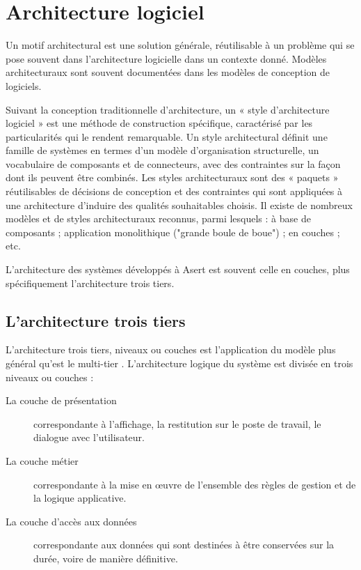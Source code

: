 \section{Architecture logiciel}

Un motif architectural est une solution générale, réutilisable à un problème qui se pose souvent dans l'architecture logicielle dans un contexte donné. Modèles architecturaux sont souvent documentées dans les modèles de conception de logiciels. \cite{software-arch} 

Suivant la conception traditionnelle d'architecture, un « style d'architecture logiciel » est une méthode de construction spécifique, caractérisé par les particularités qui le rendent remarquable. Un style architectural définit une famille de systèmes en termes d'un modèle d'organisation structurelle, un vocabulaire de composants et de connecteurs, avec des contraintes sur la façon dont ils peuvent être combinés. Les styles architecturaux sont des « paquets » réutilisables de décisions de conception et des contraintes qui sont appliquées à une architecture d'induire des qualités souhaitables choisis. Il existe de nombreux modèles et de styles architecturaux reconnus, parmi lesquels : à base de composants ; application monolithique ("grande boule de boue") ; en couches ; etc. \cite{software-arch-patterns}

L'architecture des systèmes développés à Asert est souvent celle en couches, plus spécifiquement l'architecture trois tiers.

\subsection{L'architecture trois tiers}

L'architecture trois tiers, niveaux ou couches est l'application du modèle plus général qu'est le multi-tier \cite{n-tier}. L'architecture logique du système est divisée en trois niveaux ou couches : 
\begin{description}
\item[La couche de présentation] correspondante à l'affichage, la restitution sur le poste de travail, le dialogue avec l'utilisateur.
\item[La couche métier] correspondante à la mise en œuvre de l'ensemble des règles de gestion et de la logique applicative.
\item[La couche d'accès aux données] correspondante aux données qui sont destinées à être conservées sur la durée, voire de manière définitive.
\end{description}

